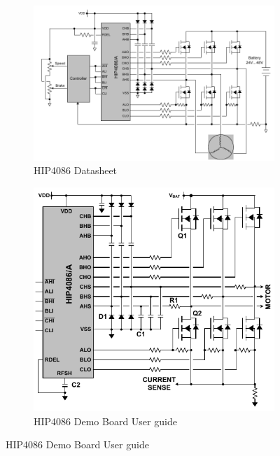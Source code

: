 \documentclass{article}
\begin{document}
\begin{figure}[h]
	\caption{Alternate clamping circuitry from the HIP4086 documentation\protect\footnotemark.}
	\label{fig:clamping}
	\centering
	\begin{subfigure}{0.5\textwidth}
		\includegraphics[width=\textwidth]{clamp1}
		\caption{HIP4086 Datasheet}
	\end{subfigure}
	\quad
	\begin{subfigure}{0.35\textwidth}
		\includegraphics[width=\textwidth]{clamp2}
		\caption{HIP4086 Demo Board User guide}
	\end{subfigure}	
\end{figure}
\end{document}
